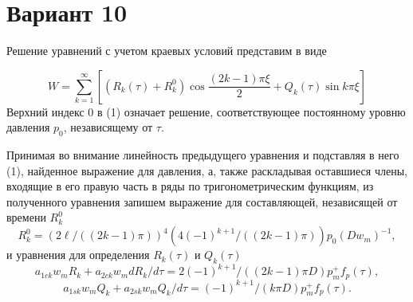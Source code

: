 \documentclass{article}
\begin{document}
\section*{Вариант 10}

Решение уравнений с учетом краевых условий представим в виде

\begin{equation}
    W = \sum\limits_{k=1}^{\infty} \left[\left(R_k(\tau)+R^0_k\right) \cos{\frac{(2k-1)\pi\xi}{2} + Q_k(\tau) \sin{k\pi\xi}} \right]
\end{equation}
Верхний индекс 0 в (1) означает решение, соответствующее постоянному уровню давления $p_0$, независящему от $\tau$.

Принимая во внимание линейность предыдущего уравнения и подставляя в него (1), найденное выражение для давления, а, также раскладывая оставшиеся члены, входящие в его правую часть в ряды по тригонометрическим функциям, из полученного уравнения запишем выражение для составляющей, независящей от времени $R^0_k$
\begin{equation*}
    R^0_k = \left(2\ell/\left(\left(2k-1\right)\pi\right)\right)^4 \left(4\left(-1\right)^{k+1}/\left(\left(2k-1\right)\pi\right)\right) p_0\left(Dw_m\right)^{-1},
\end{equation*}
и уравнения для определения $R_k(\tau)$ и $Q_k(\tau)$
\begin{equation}
    a_{1ck}w_m R_k +  a_{2ck}w_m d R_k / d\tau = 2(-1)^{k+1}/((2k-1)\pi D) p_m^+ f_p(\tau),
\end{equation}
\begin{equation}
    a_{1sk}w_m Q_k + a_{2sk} w_m Q_k/d\tau = (-1)^{k+1}/(k\pi D)p_m^+ f_p(\tau).
\end{equation}
\end{document}
